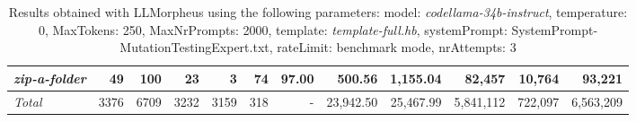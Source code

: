 \begin{table*}
{\begin{tabular}{l||r|r|r|r|r|r||r|r||r|r|r}
   \hline
   \textit{zip-a-folder} & 49 & 100 & 23 & 3 & 74 & 97.00 & 500.56 & 1,155.04 & 82,457 & 10,764 & 93,221 \\ 
   \hline
   \textit{Total} & 3376 & 6709 & 3232 & 3159 & 318 & - & 23,942.50  & 25,467.99 & 5,841,112 & 722,097 & 6,563,209 \\ 
 \end{tabular}
 }
 \caption{Results obtained with LLMorpheus using the following parameters: 
   model: \textit{codellama-34b-instruct}, 
   temperature: 0, 
   MaxTokens: 250, 
   MaxNrPrompts: 2000, 
   template: \textit{template-full.hb}, 
   systemPrompt: SystemPrompt-MutationTestingExpert.txt, 
   rateLimit: benchmark mode, 
   nrAttempts: 3  
 }
\end{table*}

